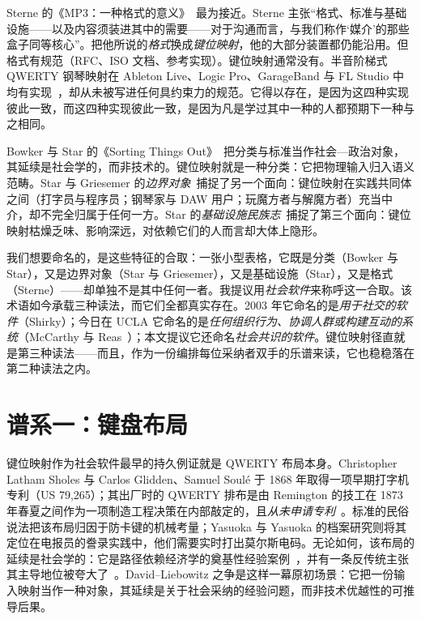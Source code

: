 \documentclass[10pt,letterpaper,twocolumn]{article}
\begin{document}
Sterne 的《MP3：一种格式的意义》~\citep{sterne2012mp3}最为接近。Sterne 主张“格式、标准与基础设施——以及内容须装进其中的需要——对于沟通而言，与我们称作‘媒介’的那些盒子同等核心”。把他所说的\emph{格式}换成\emph{键位映射}，他的大部分装置都仍能沿用。但格式有规范（RFC、ISO 文档、参考实现）。键位映射通常没有。半音阶梯式 QWERTY 钢琴映射在 Ableton Live、Logic Pro、GarageBand 与 FL Studio 中均有实现~\citep{ableton_musical_typing,apple_logic_musicaltyping,imageline_typing_piano}，却从未被写进任何具约束力的规范。它得以存在，是因为这四种实现彼此一致，而这四种实现彼此一致，是因为凡是学过其中一种的人都预期下一种与之相同。

Bowker 与 Star 的《Sorting Things Out》~\citep{bowker1999sorting}把分类与标准当作社会—政治对象，其延续是社会学的，而非技术的。键位映射就是一种分类：它把物理输入归入语义范畴。Star 与 Griesemer 的\emph{边界对象}~\citep{star1989boundary}捕捉了另一个面向：键位映射在实践共同体之间（打字员与程序员；钢琴家与 DAW 用户；玩魔方者与解魔方者）充当中介，却不完全归属于任何一方。Star 的\emph{基础设施民族志}~\citep{star1999ethnography}捕捉了第三个面向：键位映射枯燥乏味、影响深远，对依赖它们的人而言却大体上隐形。

我们想要命名的，是这些特征的合取：一张小型表格，它既是分类（Bowker 与 Star），又是边界对象（Star 与 Griesemer），又是基础设施（Star），又是格式（Sterne）——却单独不是其中任何一者。我提议用\emph{社会软件}来称呼这一合取。该术语如今承载三种读法，而它们全都真实存在。2003 年它命名的是\emph{用于社交的软件}（Shirky）；今日在 UCLA 它命名的是\emph{任何组织行为、协调人群或构建互动的系统}（McCarthy 与 Reas~\citep{sosoft_info}）；本文提议它还命名\emph{社会共识的软件}。键位映射径直就是第三种读法——而且，作为一份编排每位采纳者双手的乐谱来读，它也稳稳落在第二种读法之内。

\section{谱系一：键盘布局}
\label{sec:lineage1}

键位映射作为社会软件最早的持久例证就是 QWERTY 布局本身。Christopher Latham Sholes 与 Carlos Glidden、Samuel Soulé 于 1868 年取得一项早期打字机专利（US 79{,}265）；其出厂时的 QWERTY 排布是由 Remington 的技工在 1873 年春夏之间作为一项制造工程决策在内部敲定的，且\emph{从未申请专利}~\citep{yasuoka2011prehistory}。标准的民俗说法把该布局归因于防卡键的机械考量；Yasuoka 与 Yasuoka 的档案研究则将其定位在电报员的誊录实践中，他们需要实时打出莫尔斯电码。无论如何，该布局的延续是社会学的：它是路径依赖经济学的奠基性经验案例~\citep{david1985qwerty,arthur1989competing}，并有一条反传统主张其主导地位被夸大了~\citep{liebowitz1990fable}。David--Liebowitz 之争是这样一幕原初场景：它把一份输入映射当作一种对象，其延续是关于社会采纳的经验问题，而非技术优越性的可推导后果。
\end{document}
